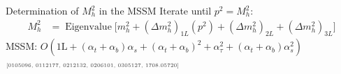 \documentclass[hyperref={pdfpagelabels=false},ngerman]{beamer}
\newcommand{\mycite}[1]{\ensuremath{\text{\textcolor{darkgray}{\tiny [#1]}}}}
\newcommand{\at}{\alpha_t}
\newcommand{\ab}{\alpha_b}
\newcommand{\atau}{\alpha_\tau}
\newcommand{\as}{\alpha_s}
\DeclareMathOperator{\Eigenvalue}{Eigenvalue}
\begin{document}
\begin{frame}[noframenumbering]{Determination of $M_h^2$ in the MSSM}
  Iterate until $p^2 = M_h^2$:
  \begin{align*}
    M_h^2 &= \Eigenvalue\Big[
            m_h^2 + (\Delta m_h^2)_{1L}(p^2)
            + (\Delta m_h^2)_{2L} + (\Delta m_h^2)_{3L}
            \Big]
  \end{align*}
  MSSM: $O(\text{1L} + (\at+\ab)\as + (\at+\ab)^2 + \atau^2 + (\at + \ab)\as^2)$\\
  \hspace{2em} \mycite{0105096, 0112177, 0212132, 0206101, 0305127, 1708.05720}
\end{frame}
\end{document}
